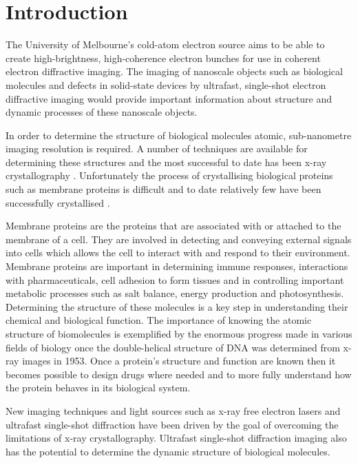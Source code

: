 \section{Introduction}

The University of Melbourne's cold-atom electron source aims to be able to create high-brightness, high-coherence electron bunches for use in coherent electron diffractive imaging. The imaging of nanoscale objects such as biological molecules\cite{dwyer_femtosecond_2006, williamson_clocking_1997} and defects in solid-state devices\cite{siwick_atomic-level_2003} by ultrafast, single-shot electron diffractive imaging would provide important information about structure and dynamic processes of these nanoscale objects.

In order to determine the structure of biological molecules atomic, sub-nanometre imaging resolution is required. A number of techniques are available for determining these structures \cite{nettleship_methods_2008, svergun_small-angle_2003, opella_structure_2004} and the most successful to date has been x-ray crystallography \cite{kendrew_three-dimensional_1958, uson_advances_1999}. Unfortunately the process of crystallising biological proteins such as membrane proteins is difficult and to date relatively few have been successfully crystallised \cite{geerlof_impact_2006}.

Membrane proteins are the proteins that are associated with or attached to the membrane of a cell. They are involved in detecting and conveying external signals into cells which allows the cell to interact with and respond to their environment\cite{almen_mapping_2009}. Membrane proteins are important in determining immune responses, interactions with pharmaceuticals, cell adhesion to form tissues and in controlling important metabolic processes such as salt balance, energy production and photosynthesis\cite{chiras_human_2011}. Determining the structure of these molecules is a key step in understanding their chemical and biological function. The importance of knowing the atomic structure of biomolecules is exemplified by the enormous progress made in various fields of biology once the double-helical structure of DNA was determined from x-ray images in 1953\cite{watson_molecular_1953}. Once a protein's structure and function are known then it becomes possible to design drugs\cite{pinto_influenza_1992} where needed and to more fully understand how the protein behaves in its biological system.

New imaging techniques and light sources such as x-ray free electron lasers and  ultrafast single-shot diffraction have been driven by the goal of overcoming the limitations of x-ray crystallography. Ultrafast single-shot diffraction imaging also has the potential to determine the dynamic structure of biological molecules.

